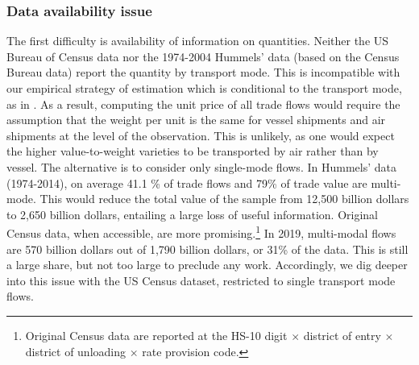 \documentclass[a4paper,11pt]{article}
\begin{document}



\subsubsection{Data availability issue}

The first difficulty is availability of information on quantities. Neither the US Bureau of Census data nor the 1974-2004 Hummels' data (based on the Census Bureau data) report the quantity by transport mode. This is incompatible with our empirical strategy of estimation which is conditional to the transport mode, as in \cite{hummels2007}. As a result, computing the unit price of all trade flows would require the assumption that the weight per unit is the same for vessel shipments and air shipments at the level of the observation. This is unlikely, as one would expect the higher value-to-weight varieties to be transported by air rather than by vessel. The alternative is to consider only single-mode flows. In Hummels' data (1974-2014), on average 41.1 \% of trade flows and 79\% of trade value are multi-mode. This would reduce the total value of the sample from 12,500 billion dollars to 2,650 billion dollars, entailing a large loss of useful information. Original Census data, when accessible, are more promising.\footnote{Original Census data are  reported at the HS-10 digit $\times$ district of entry $\times$ district of unloading $\times$ rate provision code.} In 2019, multi-modal flows are 570 billion dollars out of 1,790 billion dollars, or 31\% of the data. This is still a large share, but not too large to preclude any work. Accordingly, we dig deeper into this issue with the US Census dataset, restricted to single transport mode flows. \smallskip
\end{document}
